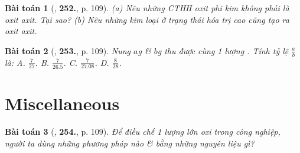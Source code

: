 \documentclass{article}
\numberwithin{equation}{section}
\newtheorem{baitoan}{Bài toán}
\begin{document}
\begin{baitoan}[\cite{An_400_BT_Hoa_Hoc_8_2020}, \textbf{252.}, p. 109]
	(a) Nêu những CTHH oxit phi kim không phải là oxit axit. Tại sao? (b) Nêu những kim loại ở trạng thái hóa trị cao cũng tạo ra oxit axit.
\end{baitoan}

\begin{baitoan}[\cite{An_400_BT_Hoa_Hoc_8_2020}, \textbf{253.}, p. 109]
	Nung $a$\emph{g} \emph{} \& $b$\emph{g} \emph{} thu được cùng 1 lượng \emph{}. Tính tỷ lệ $\frac{a}{b}$ là: {\sf A.} $\frac{7}{27}$. {\sf B.} $\frac{7}{26.5}$. {\sf C.} $\frac{7}{27.08}$. {\sf D.} $\frac{8}{28}$.
\end{baitoan}


\section{Miscellaneous}

\begin{baitoan}[\cite{An_400_BT_Hoa_Hoc_8_2020}, \textbf{254.}, p. 109]
	Để điều chế 1 lượng lớn oxi trong công nghiệp, người ta dùng những phương pháp nào \& bằng những nguyên liệu gì?
\end{baitoan}


\printbibliography[heading=bibintoc]
	
\end{document}
